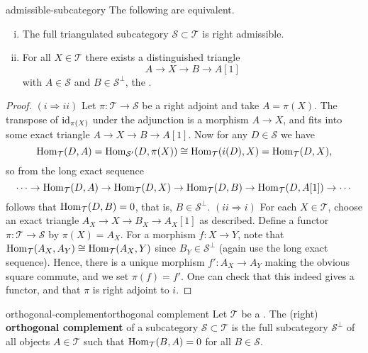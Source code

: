 \begin{example}{admissible-subcategory}
    The following are equivalent.
    \begin{enumerate}[(i)]
        \item The full triangulated subcategory $\mathcal{S} \subset \mathcal{T}$ is right admissible.
        \item For all $X \in \mathcal{T}$ there exists a distinguished triangle
        \[ A \to X \to B \to A[1] \]
        with $A \in \mathcal{S}$ and $B \in {\mathcal{S}}^\perp$, the .
    \end{enumerate}
    \begin{proof}
        $(i \Rightarrow ii)$ Let $\pi : \mathcal{T} \to \mathcal{S}$ be a right adjoint and take $A = \pi(X)$. The transpose of $\textup{id}_{\pi(X)}$ under the adjunction is a morphism $A \to X$, and fits into some exact triangle $A \to X \to B \to A[1]$. Now for any $D \in \mathcal{S}$ we have
        \[ \operatorname{Hom}_\mathcal{T}(D, A) = \operatorname{Hom}_{\mathcal{S}'}(D, \pi(X)) \cong \operatorname{Hom}_\mathcal{T}(i(D), X) = \operatorname{Hom}_\mathcal{T}(D, X) , \]
        so from the long exact sequence
        \[ \cdots \to \operatorname{Hom}_\mathcal{T}(D, A) \to \operatorname{Hom}_\mathcal{T}(D, X) \to \operatorname{Hom}_\mathcal{T}(D, B) \to \operatorname{Hom}_\mathcal{T}(D, A[1]) \to \cdots \]
        follows that $\operatorname{Hom}_\mathcal{T}(D, B) = 0$, that is, $B \in \mathcal{S}^\perp$.
        $(ii \Rightarrow i)$ For each $X \in \mathcal{T}$, choose an exact triangle $A_X \to X \to B_X \to A_X[1]$ as described. Define a functor $\pi : \mathcal{T} \to \mathcal{S}$ by $\pi(X) = A_X$. For a morphism $f : X \to Y$, note that $\operatorname{Hom}_\mathcal{T}(A_X, A_Y) \cong \operatorname{Hom}_\mathcal{T}(A_X, Y)$ since $B_Y \in \mathcal{S}^\perp$ (again use the long exact sequence). Hence, there is a unique morphism $f' : A_X \to A_Y$ making the obvious square commute, and we set $\pi(f) = f'$. One can check that this indeed gives a functor, and that $\pi$ is right adjoint to $i$.
    \end{proof}
\end{example}

\begin{topic}{orthogonal-complement}{orthogonal complement}
    Let $\mathcal{T}$ be a . The (right) \textbf{orthogonal complement} of a subcategory $\mathcal{S} \subset \mathcal{T}$ is the full subcategory $\mathcal{S}^\perp$ of all objects $A \in \mathcal{T}$ such that $\operatorname{Hom}_\mathcal{T}(B, A) = 0$ for all $B \in \mathcal{S}$.
\end{topic}

